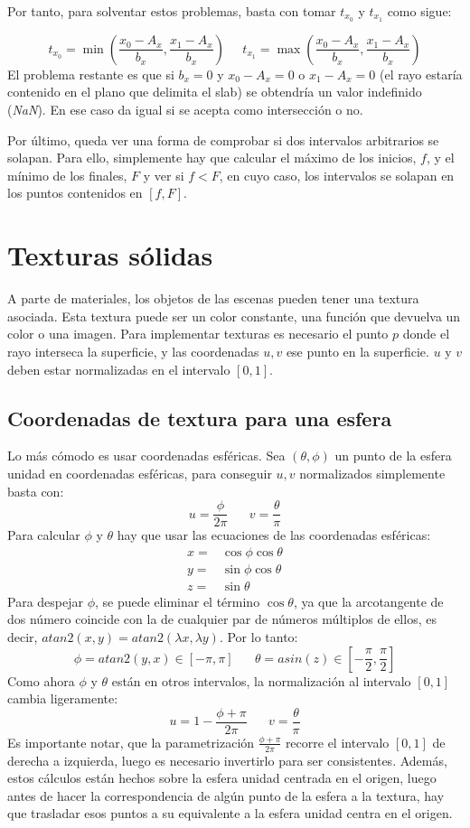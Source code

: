 \documentclass[12pt]{article}
\theoremstyle{definition}
\theoremstyle{remark}
\begin{document}
Por tanto, para solventar estos problemas, basta con tomar $t_{x_0}$ y $t_{x_1}$ como sigue:

\[
t_{x_0}=\min\left(\frac{x_0-A_x}{b_x},\frac{x_1-A_x}{b_x}\right) \;\;\;\;\;t_{x_1}=\max\left(\frac{x_0-A_x}{b_x},\frac{x_1-A_x}{b_x}\right)
\]
El problema restante es que si $b_x=0$ y $x_0-A_x=0$ o $x_1-A_x=0$ (el rayo estaría contenido en el plano que delimita el slab) se obtendría un valor indefinido (\textit{NaN}). En ese caso da igual si se acepta como intersección o no.

Por último, queda ver una forma de comprobar si dos intervalos arbitrarios se solapan. Para ello, simplemente hay que calcular el máximo de los inicios, $f$, y el mínimo de los finales, $F$ y ver si $f<F$, en cuyo caso, los intervalos se solapan en los puntos contenidos en $[f,F]$. 

\section{Texturas sólidas}

A parte de materiales, los objetos de las escenas pueden tener una textura asociada. Esta textura puede ser un color constante, una función que devuelva un color o una imagen. Para implementar texturas es necesario el punto $p$ donde el rayo interseca la superficie, y las coordenadas $u,v$ ese punto en la superficie. $u$ y $v$ deben estar normalizadas en el intervalo $[0,1]$.

\subsection{Coordenadas de textura para una esfera}

Lo más cómodo es usar coordenadas esféricas. Sea $(\theta,\phi)$ un punto de la esfera unidad en coordenadas esféricas, para conseguir $u,v$ normalizados simplemente basta con:
\[
u=\frac{\phi}{2\pi} \;\;\;\;\;\; v=\frac{\theta}{\pi}
\]
Para calcular $\phi$ y $\theta$ hay que usar las ecuaciones de las coordenadas esféricas:
\[
\begin{array}{rl}
x = & \cos\phi\cos\theta\\
y = & \sin\phi\cos\theta\\
z = & \sin\theta
\end{array}
\]
Para despejar $\phi$, se puede eliminar el término $\cos\theta$, ya que la arcotangente de dos número coincide con la de cualquier par de números múltiplos de ellos, es decir, $atan2(x,y)=atan2(\lambda x, \lambda y)$. Por lo tanto:
\[
\phi=atan2(y,x)\in[-\pi,\pi] \;\;\;\;\;\; \theta=asin(z)\in\left[-\frac{\pi}{2},\frac{\pi}{2}\right]
\]
Como ahora $\phi$ y $\theta$ están en otros intervalos, la normalización al intervalo $[0,1]$ cambia ligeramente:
\[
u=1-\frac{\phi+\pi}{2\pi} \;\;\;\;\;\; v=\frac{\theta}{\pi}
\]
Es importante notar, que la parametrización $\frac{\phi+\pi}{2\pi}$ recorre el intervalo $[0,1]$ de derecha a izquierda, luego es necesario invertirlo para ser consistentes. Además, estos cálculos están hechos sobre la esfera unidad centrada en el origen, luego antes de hacer la correspondencia de algún punto de la esfera a la textura, hay que trasladar esos puntos a su equivalente a la esfera unidad centra en el origen.
\end{document}
